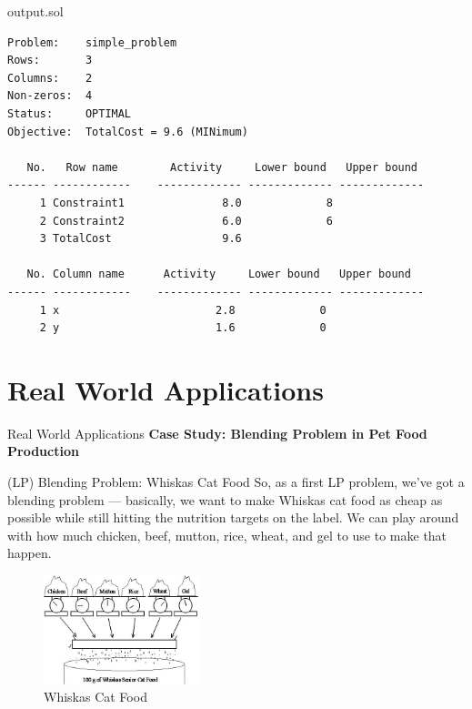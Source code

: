 \documentclass{purdue-slide}
\begin{document}
\begin{frame}[fragile]{output.sol}
\begin{verbatim}
Problem:    simple_problem
Rows:       3
Columns:    2
Non-zeros:  4
Status:     OPTIMAL
Objective:  TotalCost = 9.6 (MINimum)

   No.   Row name        Activity     Lower bound   Upper bound
------ ------------    ------------- ------------- -------------
     1 Constraint1               8.0             8
     2 Constraint2               6.0             6
     3 TotalCost                 9.6

   No. Column name      Activity     Lower bound   Upper bound
------ ------------    ------------- ------------- -------------
     1 x                        2.8             0
     2 y                        1.6             0	
\end{verbatim}	
\end{frame}

\section{Real World Applications}

\begin{titleframe}{Real World Applications}
	\textbf{Case Study: Blending Problem in Pet Food Production}
\end{titleframe}

\begin{frame}{(LP) Blending Problem: Whiskas Cat Food}
	So, as a first LP problem, we've
	got a blending problem —
	basically, we want to make
	Whiskas cat food as cheap as
	possible while still hitting the
	nutrition targets on the label. We
	can play around with how much
	chicken, beef, mutton, rice, wheat,
	and gel to use to make that
	happen.

	\begin{figure}[H]
		\centering
		\includegraphics[width=0.4\textwidth]{pics/whiskas_blend_intro.jpg}
		\caption{Whiskas Cat Food}
	\end{figure}
\end{frame}
\end{document}
